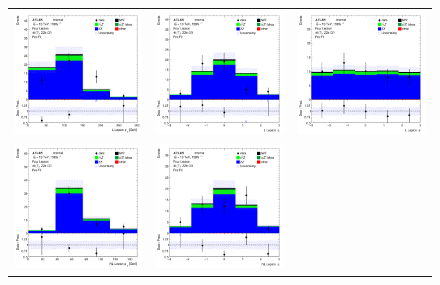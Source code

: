 \begin{figure}[htbp]
  \begin{tabular}{ccc}


    \includegraphics[width=.3\textwidth]{figures/PreFitPlots/lep4_ZZb_4T_L_lepton_pt.png} &
    \includegraphics[width=.3\textwidth]{figures/PreFitPlots/lep4_ZZb_4T_L_lepton_eta.png} &
    \includegraphics[width=.3\textwidth]{figures/PreFitPlots/lep4_ZZb_4T_L_lepton_phi.png} \\
    \includegraphics[width=.3\textwidth]{figures/PreFitPlots/lep4_ZZb_4T_NL_lepton_pt.png} &
    \includegraphics[width=.3\textwidth]{figures/PreFitPlots/lep4_ZZb_4T_NL_lepton_eta.png} &

\end{tabular}
\end{figure}

